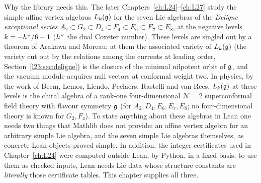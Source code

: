 Why the library needs this. The later Chapters~\ref{ch:L24}--\ref{ch:L27} study the simple affine vertex algebras
$L_k(\mathfrak g)$ for the seven Lie algebras of the \emph{Deligne exceptional series}
$A_2\subset G_2\subset D_4\subset F_4\subset E_6\subset E_7\subset E_8$, at the negative levels $k=-h^\vee/6-1$
($h^\vee$ the dual Coxeter number). These levels are singled out by a theorem of Arakawa and Moreau: at them
the associated variety of $L_k(\mathfrak g)$ (the variety cut out by the relations among the currents at leading
order, Section~\ref{l23:sec:deligne}) is the closure of the minimal nilpotent orbit of $\mathfrak g$, and the vacuum
module acquires null vectors at conformal weight two. In physics, by the work of Beem, Lemos, Liendo, Peelaers,
Rastelli and van Rees, $L_k(\mathfrak g)$ at these levels is the chiral algebra of a rank-one four-dimensional
$\mathcal N=2$ superconformal field theory with flavour symmetry $\mathfrak g$ (for $A_2,D_4,E_6,E_7,E_8$; no
four-dimensional theory is known for $G_2,F_4$). To state anything about these algebras in Lean one needs two things
that Mathlib does not provide: an affine vertex algebra for an arbitrary simple Lie algebra, and the seven simple Lie
algebras themselves, as concrete Lean objects proved simple. In addition, the integer certificates used in
Chapter~\ref{ch:L24} were computed outside Lean, by Python, in a fixed basis; to use them as checked inputs, Lean
needs Lie data whose structure constants are \emph{literally} those certificate tables. This chapter supplies all
three.

